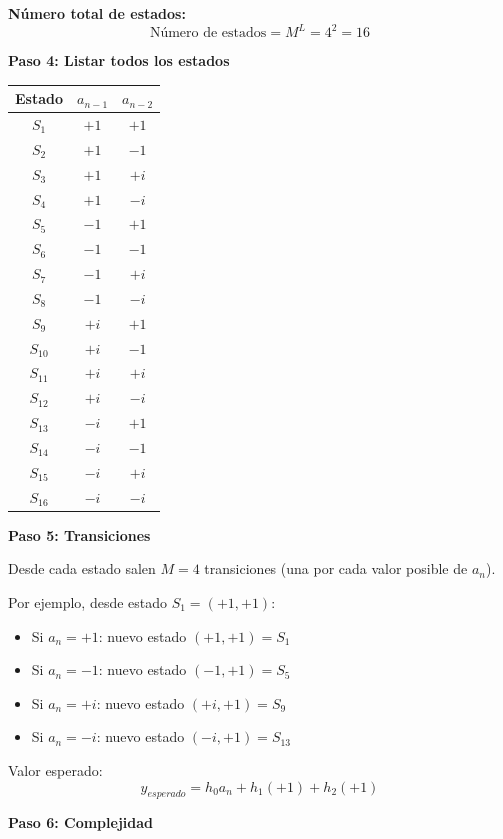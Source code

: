 \documentclass[11pt,a4paper]{article}
\begin{document}
\textbf{N\'umero total de estados:}
\[
\boxed{\text{N\'umero de estados} = M^L = 4^2 = 16}
\]

\textbf{Paso 4: Listar todos los estados}

\begin{center}
\begin{tabular}{|c|c|c|}
\hline
\textbf{Estado} & \textbf{$a_{n-1}$} & \textbf{$a_{n-2}$} \\
\hline
$S_1$ & $+1$ & $+1$ \\
$S_2$ & $+1$ & $-1$ \\
$S_3$ & $+1$ & $+i$ \\
$S_4$ & $+1$ & $-i$ \\
\hline
$S_5$ & $-1$ & $+1$ \\
$S_6$ & $-1$ & $-1$ \\
$S_7$ & $-1$ & $+i$ \\
$S_8$ & $-1$ & $-i$ \\
\hline
$S_9$ & $+i$ & $+1$ \\
$S_{10}$ & $+i$ & $-1$ \\
$S_{11}$ & $+i$ & $+i$ \\
$S_{12}$ & $+i$ & $-i$ \\
\hline
$S_{13}$ & $-i$ & $+1$ \\
$S_{14}$ & $-i$ & $-1$ \\
$S_{15}$ & $-i$ & $+i$ \\
$S_{16}$ & $-i$ & $-i$ \\
\hline
\end{tabular}
\end{center}

\textbf{Paso 5: Transiciones}

Desde cada estado salen $M = 4$ transiciones (una por cada valor posible de $a_n$).

Por ejemplo, desde estado $S_1 = (+1, +1)$:
\begin{itemize}
    \item Si $a_n = +1$: nuevo estado $(+1, +1) = S_1$
    \item Si $a_n = -1$: nuevo estado $(-1, +1) = S_5$
    \item Si $a_n = +i$: nuevo estado $(+i, +1) = S_9$
    \item Si $a_n = -i$: nuevo estado $(-i, +1) = S_{13}$
\end{itemize}

Valor esperado:
\[
y_{esperado} = h_0 a_n + h_1(+1) + h_2(+1)
\]

\textbf{Paso 6: Complejidad}
\end{document}
